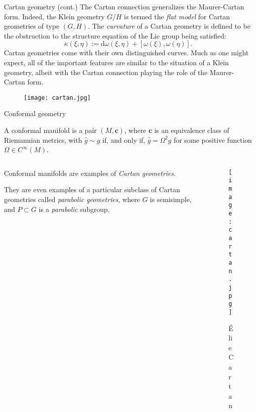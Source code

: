 \documentclass[handout]{beamer}
\renewcommand{\hat}{\widehat}
\begin{document}
\begin{frame}{Cartan geometry (cont.)}
  The Cartan connection generalizes the Maurer-Cartan form.
  Indeed, the Klein geometry $G/H$ is termed the \emph{flat model} for Cartan geometries of type $(G,H)$.
  The \emph{curvature} of a Cartan geometry is defined to be the obstruction to the structure equation of the Lie group being satisfied:
  \[
    \kappa(\xi, \eta) := \text{d}\omega(\xi, \eta) + [\omega(\xi), \omega(\eta)].
  \]
  Cartan geometries come with their own distinguished curves.
  Much as one might expect, all of the important features are similar to the situation of a Klein geometry, albeit with the Cartan connection playing the role of the Maurer-Cartan form. 
  \begin{figure}
    \texttt{[image: cartan.jpg]}
  \end{figure}
\end{frame}

\begin{frame}{Conformal geometry}

  \begin{definition}
    A conformal manifold is a pair \( (M, \bm{c}) \), where \( \bm{c} \) is an equivalence class of Riemannian metrics, with \( \hat{g} \sim g \) if, and only if, \( \hat{g} = \Omega^2 g \) for some positive function \( \Omega \in C^\infty (M) \).
  \end{definition}

  \begin{columns}
    \begin{column}{0.6\textwidth}
      \pause
      Conformal manifolds are examples of \emph{Cartan geometries}.
      \vspace{1em}

      \pause
      They are even examples of 
      a particular subclass of Cartan geometries called \emph{parabolic geometries}, where \( G \) is semisimple, and \( P \subset G \) is a \emph{parabolic} subgroup.
    \end{column}
      \begin{column}{0.4\textwidth}
        \hspace{1.5em}
        \begin{figure}
          \texttt{[image: cartan.jpg]}
          \caption*{\'{E}lie Cartan}
        \end{figure}
      \end{column}
  \end{columns}

\end{frame}
\end{document}
